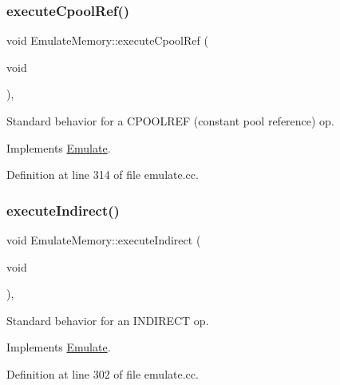 \subsubsection{\texorpdfstring{executeCpoolRef()}{executeCpoolRef()}}
{\footnotesize\ttfamily void Emulate\+Memory\+::execute\+Cpool\+Ref (\begin{DoxyParamCaption}\item[{void}]{ }\end{DoxyParamCaption})\hspace{0.3cm}{\ttfamily [protected]}, {\ttfamily [virtual]}}



Standard behavior for a C\+P\+O\+O\+L\+R\+EF (constant pool reference) op. 



Implements \mbox{\hyperlink{class_emulate_a544e0f87351d29a0336b56c06fe8b3c3}{Emulate}}.



Definition at line 314 of file emulate.\+cc.

\mbox{\label{class_emulate_memory_a10021d3e2d5ea193a3dd6f372077c3ce}} 
\subsubsection{\texorpdfstring{executeIndirect()}{executeIndirect()}}
{\footnotesize\ttfamily void Emulate\+Memory\+::execute\+Indirect (\begin{DoxyParamCaption}\item[{void}]{ }\end{DoxyParamCaption})\hspace{0.3cm}{\ttfamily [protected]}, {\ttfamily [virtual]}}



Standard behavior for an I\+N\+D\+I\+R\+E\+CT op. 



Implements \mbox{\hyperlink{class_emulate_aa791523787e5154d73bfe0e846a2cd38}{Emulate}}.



Definition at line 302 of file emulate.\+cc.

\mbox{\label{class_emulate_memory_ad612d22e967669919fd5c8538ade212f}} 
